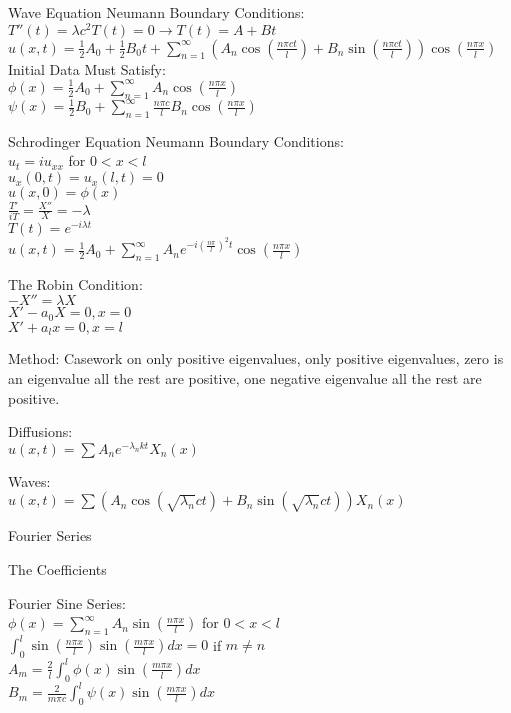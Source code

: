 Wave Equation Neumann Boundary Conditions: \\
$T''(t)=\lambda c^2 T(t)=0 \to T(t)=A+Bt$ \\
$u(x,t)=\frac{1}{2}A_0 + \frac{1}{2}B_0 t + \sum_{n=1}^{\infty} \left(A_n \cos \left( \frac{n \pi ct}{l} \right) + B_n \sin \left(\frac{n \pi ct}{l} \right) \right) \cos \left(\frac{n \pi x}{l} \right)$ \\
Initial Data Must Satisfy: \\
$\phi (x)=\frac{1}{2} A_0 + \sum_{n=1}^{\infty} A_n \cos \left(\frac{n \pi x}{l} \right)$ \\
$\psi (x)=\frac{1}{2} B_0 + \sum_{n=1}^{\infty} \frac{n \pi c}{l} B_n \cos \left(\frac{n \pi x}{l} \right)$

Schrodinger Equation Neumann Boundary Conditions: \\
$u_t=i u_{xx}$ for $ 0<x<l$ \\
$u_x(0,t)=u_x(l,t)=0$ \\
$u(x,0)=\phi (x)$ \\
$\frac{T'}{iT}=\frac{X''}{X}=-\lambda$ \\
$T(t)=e^{-i\lambda t}$ \\
$u(x,t)=\frac{1}{2}A_0 + \sum_{n=1}^{\infty} A_n e^{-i \left(\frac{n \pi}{l} \right)^2 t} \cos \left(\frac{n \pi x}{l} \right)$

The Robin Condition: \\
$-X''=\lambda X$ \\
$X'-a_0 X=0, x=0$ \\
$X'+a_l x=0, x=l$

Method: Casework on only positive eigenvalues, only positive eigenvalues, zero is an eigenvalue all the rest are positive, one negative eigenvalue all the rest are positive.

Diffusions: \\
$u(x,t)=\sum A_n e^{- \lambda_n kt} X_n(x)$

Waves: \\
$u(x,t)=\sum (A_n \cos(\sqrt{\lambda_n}ct) + B_n \sin(\sqrt{\lambda_n}ct)) X_n(x)$

Fourier Series

The Coefficients

Fourier Sine Series: \\
$\phi (x)=\sum_{n=1}^{\infty} A_n \sin \left(\frac{n \pi x}{l} \right)$ for $ 0<x<l$ \\
$\int_0^l \sin \left(\frac{n \pi x}{l} \right) \sin \left(\frac{m \pi x}{l} \right) dx =0$ if $m \neq n$ \\
$A_m = \frac{2}{l} \int_0^l \phi(x) \sin \left(\frac{m \pi x}{l} \right) dx$ \\
$B_m = \frac{2}{m \pi c} \int_0^l \psi (x) \sin \left(\frac{m \pi x}{l} \right) dx$

